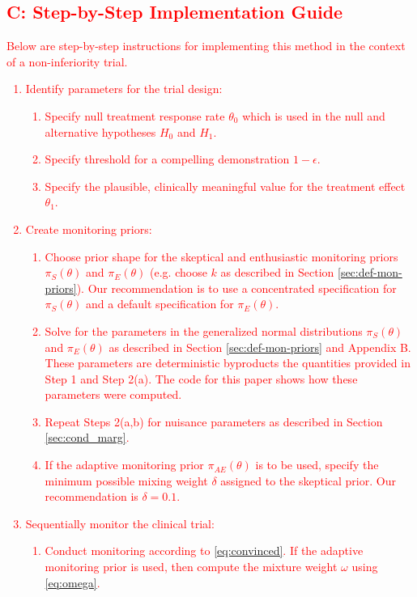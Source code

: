 \documentclass[12pt]{article}
\begin{document}
\textcolor{red}{
\subsection*{C: Step-by-Step Implementation Guide}
Below are step-by-step instructions for implementing this method in the context of a non-inferiority trial.
\begin{enumerate}
\item Identify parameters for the trial design:
\begin{enumerate}
\item Specify null treatment response rate $\theta_0$ which is used in the null and alternative hypotheses $H_0$ and $H_1$.
\item Specify threshold for a compelling demonstration $1-\epsilon$.
\item Specify the plausible, clinically meaningful value for the treatment effect $\theta_1$.
\end{enumerate}
\item Create monitoring priors:
\begin{enumerate}
\item Choose prior shape for the skeptical and enthusiastic monitoring priors $\pi_S(\theta)$ and $\pi_E(\theta)$ (e.g. choose $k$ as described in Section \ref{sec:def-mon-priors}). Our recommendation is to use a concentrated specification for $\pi_S(\theta)$ and a default specification for $\pi_E(\theta)$.
\item Solve for the parameters in the generalized normal distributions $\pi_S(\theta)$ and $\pi_E(\theta)$ as described in Section \ref{sec:def-mon-priors} and Appendix B. These parameters are deterministic byproducts the quantities provided in Step 1 and Step 2(a). The code for this paper shows how these parameters were computed.
\item Repeat Steps 2(a,b) for nuisance parameters as described in Section \ref{sec:cond_marg}.
\item If the adaptive monitoring prior $\pi_{AE}(\theta)$ is to be used, specify the minimum possible mixing weight $\delta$ assigned to the skeptical prior. Our recommendation is $\delta=0.1$.
\end{enumerate}
\item Sequentially monitor the clinical trial:
\begin{enumerate}
\item Conduct monitoring according to \eqref{eq:convinced}. If the adaptive monitoring prior is used, then compute the mixture weight $\omega$ using \eqref{eq:omega}.
\end{enumerate}
\end{enumerate}
}
\end{document}
